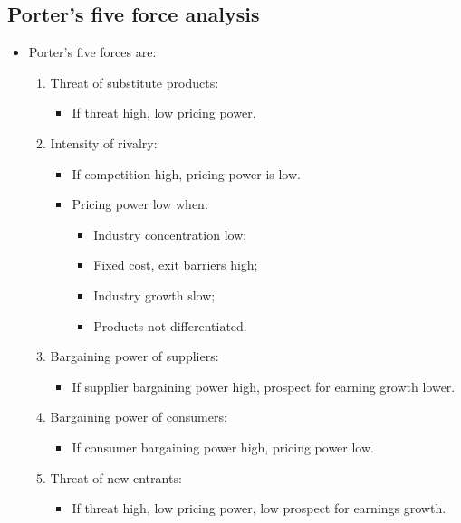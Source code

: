 \documentclass[../notes_compiled.tex]{subfiles}
\begin{document}
\subsection{Porter's five force analysis}
\label{sec-porter}
\begin{itemize}
\item Porter's five forces are:
\begin{enumerate}
\item Threat of substitute products:
\begin{itemize}
\item If threat high, low pricing power.
\end{itemize}

\item Intensity of rivalry:
\begin{itemize}
\item If competition high, pricing power is low. 
\item Pricing power low when:
\begin{itemize}
\item Industry concentration low;
\item Fixed cost, exit barriers high;
\item Industry growth slow;
\item Products not differentiated.
\end{itemize}
\end{itemize}

\item Bargaining power of suppliers:
\begin{itemize}
\item If supplier bargaining power high, prospect for earning growth lower.
\end{itemize}

\item Bargaining power of consumers:
\begin{itemize}
\item If consumer bargaining power high, pricing power low.
\end{itemize}

\item Threat of new entrants:
\begin{itemize}
\item If threat high, low pricing power, low prospect for earnings growth.
\end{itemize}
\end{enumerate}
\end{itemize}
\end{document}

